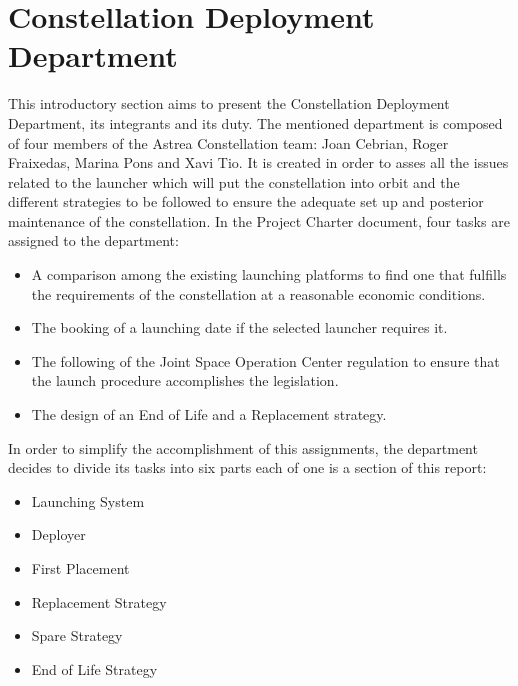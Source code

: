 

\section{Constellation Deployment Department}
This introductory section aims to present the Constellation Deployment Department, its integrants and its duty. 
\newline
The mentioned department is composed of four members of the Astrea Constellation team: Joan Cebrian, Roger Fraixedas, Marina Pons and Xavi Tio. It is created in order to asses all the issues related to the launcher which will put the constellation into orbit and the different strategies to be followed to ensure the adequate set up and posterior maintenance of the constellation. 
In the Project Charter document, four tasks are assigned to the department:
\begin{itemize}
\item A comparison among the existing launching platforms to find one that fulfills the requirements of the constellation at a reasonable economic conditions. 
\item The booking of a launching date if the selected launcher requires it.
\item The following of the Joint Space Operation Center regulation to ensure that the launch procedure accomplishes the legislation.
\item The design of an End of Life and a Replacement strategy.
\end{itemize}
In order to simplify the accomplishment of this assignments, the department decides to divide its tasks into six parts each of one is a section of this report:
\begin{itemize}
\item Launching System
\item Deployer
\item First Placement
\item Replacement Strategy
\item Spare Strategy
\item End of Life Strategy
\end{itemize}

